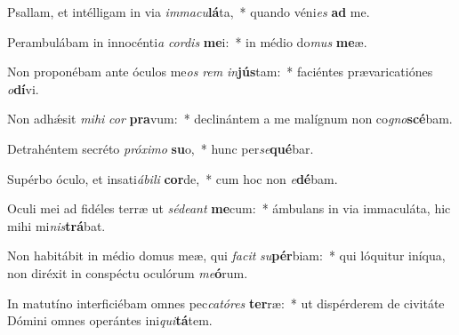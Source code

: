 \item Psallam, et intélligam in via \textit{im}\textit{ma}\textit{cu}\textbf{lá}ta,~* quando véni\textit{es} \textbf{ad} me.
\item Perambulábam in innocénti\textit{a} \textit{cor}\textit{dis} \textbf{me}i:~* in médio do\textit{mus} \textbf{me}æ.
\item Non proponébam ante óculos me\textit{os} \textit{rem} \textit{in}\textbf{jús}tam:~* faciéntes prævaricatiónes \textit{o}\textbf{dí}vi.
\item Non adhǽsit \textit{mi}\textit{hi} \textit{cor} \textbf{pra}vum:~* declinántem a me malígnum non co\textit{gno}\textbf{scé}bam.
\item Detrahéntem secréto \textit{pró}\textit{xi}\textit{mo} \textbf{su}o,~* hunc per\textit{se}\textbf{qué}bar.
\item Supérbo óculo, et insati\textit{á}\textit{bi}\textit{li} \textbf{cor}de,~* cum hoc non \textit{e}\textbf{dé}bam.
\item Oculi mei ad fidéles terræ ut \textit{sé}\textit{de}\textit{ant} \textbf{me}cum:~* ámbulans in via immaculáta, hic mihi mi\textit{nis}\textbf{trá}bat.
\item Non habitábit in médio domus meæ, qui \textit{fa}\textit{cit} \textit{su}\textbf{pér}biam:~* qui lóquitur iníqua, non diréxit in conspéctu oculórum \textit{me}\textbf{ó}rum.
\item In matutíno interficiébam omnes pec\textit{ca}\textit{tó}\textit{res} \textbf{ter}ræ:~* ut dispérderem de civitáte Dómini omnes operántes ini\textit{qui}\textbf{tá}tem.
